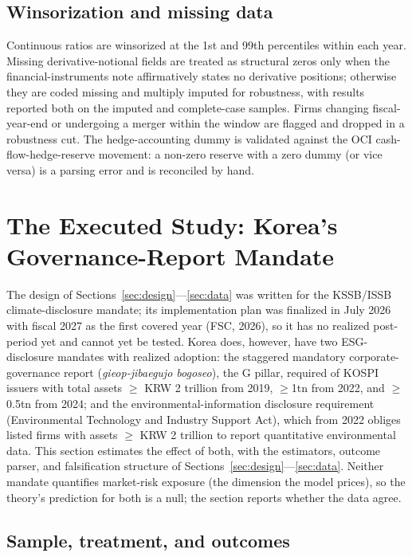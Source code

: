 \documentclass[11pt,a4paper]{article}
\begin{document}
\subsection{Winsorization and missing data}
\label{sec:cleaning}

Continuous ratios are winsorized at the 1st and 99th percentiles within each year. Missing derivative-notional fields are treated as structural zeros only when the financial-instruments note affirmatively states no derivative positions; otherwise they are coded missing and multiply imputed for robustness, with results reported both on the imputed and complete-case samples. Firms changing fiscal-year-end or undergoing a merger within the window are flagged and dropped in a robustness cut. The hedge-accounting dummy is validated against the OCI cash-flow-hedge-reserve movement: a non-zero reserve with a zero dummy (or vice versa) is a parsing error and is reconciled by hand.

\section{The Executed Study: Korea's Governance-Report Mandate}
\label{sec:executed}

The design of Sections~\ref{sec:design}---\ref{sec:data} was written for the KSSB/ISSB climate-disclosure mandate; its implementation plan was finalized in July 2026 with fiscal 2027 as the first covered year (FSC, 2026), so it has no realized post-period yet and cannot yet be tested. Korea does, however, have two ESG-disclosure mandates with realized adoption: the staggered mandatory corporate-governance report (\emph{gieop-jibaegujo bogoseo}), the G pillar, required of KOSPI issuers with total assets $\ge$ KRW 2 trillion from 2019, $\ge$1tn from 2022, and $\ge$0.5tn from 2024; and the environmental-information disclosure requirement (Environmental Technology and Industry Support Act), which from 2022 obliges listed firms with assets $\ge$ KRW 2 trillion to report quantitative environmental data. This section estimates the effect of both, with the estimators, outcome parser, and falsification structure of Sections~\ref{sec:design}---\ref{sec:data}. Neither mandate quantifies market-risk exposure (the dimension the model prices), so the theory's prediction for both is a null; the section reports whether the data agree.

\subsection{Sample, treatment, and outcomes}
\label{sec:execsample}
\end{document}
